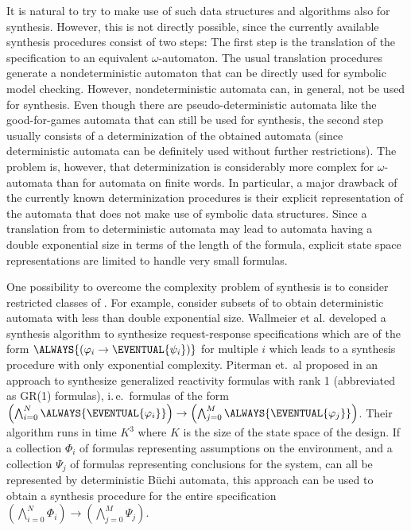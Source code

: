 \documentclass[submission,copyright,creativecommons]{eptcs}
\newcommand{\ie}{i.\,e.~}
\begin{document}
It is natural to try to make use of such data structures and algorithms also for \LTL{} synthesis. However, this is not directly possible, since the currently available \LTL{} synthesis procedures consist of two steps: The first step is the translation of the \LTL{} specification to an equivalent $\omega$-automaton. The usual translation procedures generate a nondeterministic automaton that can be directly used for symbolic model checking. However, nondeterministic automata can, in general, not be used for \LTL{} synthesis. Even though there are pseudo-deterministic automata like the good-for-games automata that can still be used for \LTL{} synthesis, the second step usually consists of a determinization of the obtained automata (since deterministic automata can be definitely used without further restrictions). The problem is, however, that determinization is considerably more complex for $\omega$-automata than for automata on finite words. In particular, a major drawback of the currently known determinization procedures is their explicit representation of the automata that does not make use of symbolic data structures. Since a translation from \LTL{} to deterministic automata may lead to automata having a double exponential size in terms of the length of the formula, explicit state space representations are limited to handle very small \LTL{} formulas.

One possibility to overcome the complexity problem of \LTL{} synthesis is to consider restricted classes of \LTL{}. For example, \cite{AlTo04,Maid00} consider subsets of \LTL{} to obtain deterministic automata with less than double exponential size. Wallmeier et al. \cite{WaHT03} developed a synthesis algorithm to synthesize request-response specifications which are of the form $\ALWAYS{(\varphi_i \rightarrow \EVENTUAL{\psi_i})}$ for multiple $i$ which leads to a synthesis procedure with only exponential complexity. Piterman et.~al proposed in \cite{PiPS06} an approach to synthesize generalized reactivity formulas with rank 1 (abbreviated as GR(1) formulas), \ie formulas of the form ${\left(\bigwedge_{i=0}^N\ALWAYS{\EVENTUAL{\varphi_i}}\right) \rightarrow \left(\bigwedge_{j=0}^M\ALWAYS{\EVENTUAL{\varphi_j}}\right)}$. Their algorithm runs in time $K^3$ where $K$ is the size of the state space of the design. If a collection $\Phi_i$ of \LTL{} formulas representing assumptions on the environment, and a collection $\Psi_j$ of formulas representing conclusions for the system, can all be represented by deterministic Büchi automata, this approach can be used to obtain a synthesis procedure for the entire \LTL{} specification ${\left(\bigwedge_{i=0}^N \Phi_i \right) \rightarrow \left(\bigwedge_{j=0}^M \Psi_j\right)}$. 
\end{document}
